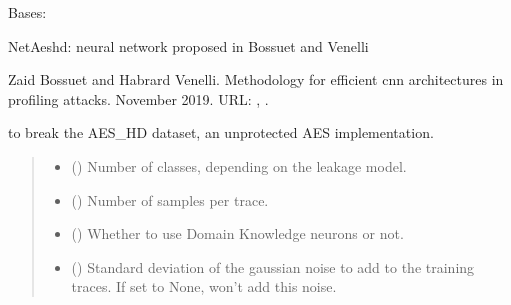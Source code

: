 \documentclass[letterpaper,10pt,english]{sphinxmanual}
\begin{document}
\begin{fulllineitems}
\label{\detokenize{MLSCAlib.Architectures:MLSCAlib.Architectures.torch_models.NetAeshd}}
\pysigstartsignatures
{}
\pysigstopsignatures
\sphinxAtStartPar
Bases: 

\sphinxAtStartPar
NetAeshd: neural network proposed in Bossuet and Venelli%
\begin{footnote}[8]\sphinxAtStartFootnote
Zaid Bossuet and Habrard Venelli. Methodology for efficient cnn architectures in profiling attacks. November 2019. URL: , .
%
\end{footnote} to break the AES\_HD dataset, an unprotected AES implementation.
\begin{quote}\begin{description}
\begin{itemize}
\item {} 
\sphinxAtStartPar
{} () \textendash{} Number of classes, depending on the leakage model.

\item {} 
\sphinxAtStartPar
{} () \textendash{} Number of samples per trace.

\item {} 
\sphinxAtStartPar
{} (\sphinxstyleliteralemphasis{\sphinxupquote{, }}) \textendash{} Whether to use Domain Knowledge neurons or not.

\item {} 
\sphinxAtStartPar
{} (\sphinxstyleliteralemphasis{\sphinxupquote{, }}) \textendash{} Standard deviation of the gaussian noise to add to the training traces. If set
to None, won’t add this noise.


\end{itemize}
\end{description}
\end{quote}
\end{fulllineitems}
\end{document}
